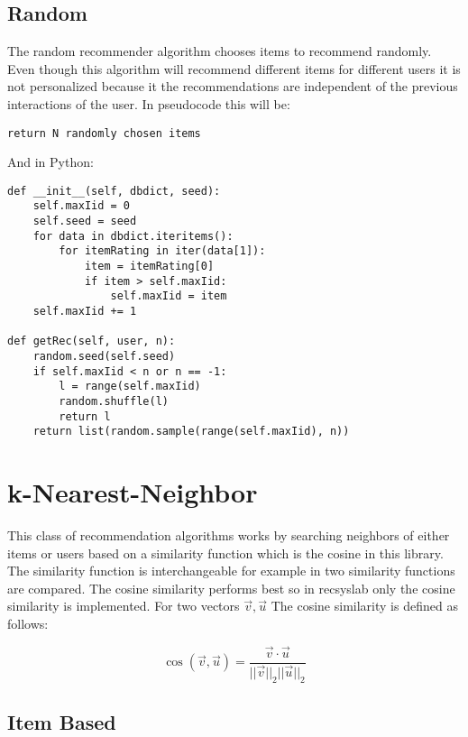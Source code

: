 \subsection{Random}

The random recommender algorithm chooses items to recommend randomly.
Even though this algorithm will recommend different items for different
users it is not personalized because it the recommendations are
independent of the previous interactions of the user.
In pseudocode this will be:
\begin{lstlisting}
return N randomly chosen items
\end{lstlisting}
And in Python:
\begin{lstlisting}
def __init__(self, dbdict, seed):
    self.maxIid = 0
    self.seed = seed
    for data in dbdict.iteritems():
        for itemRating in iter(data[1]):
            item = itemRating[0]
            if item > self.maxIid:
                self.maxIid = item
    self.maxIid += 1

def getRec(self, user, n):
    random.seed(self.seed)
    if self.maxIid < n or n == -1:
        l = range(self.maxIid)
        random.shuffle(l)
        return l
    return list(random.sample(range(self.maxIid), n))
\end{lstlisting}


\section{k-Nearest-Neighbor}

This class of recommendation algorithms works by searching neighbors
of either items or users based on a similarity function which is the
cosine in this library. The similarity function is interchangeable 
for example in
\cite{Karypis:2001:EIT:502585.502627} two similarity functions are
compared. The cosine similarity performs best so in recsyslab only the cosine similarity
is implemented. For two vectors \(\overrightarrow{v},\overrightarrow{u}\)
The cosine similarity is defined as follows:

\begin{equation}
\cos(\overrightarrow{v}, \overrightarrow{u})=\frac{\overrightarrow{v} \cdot \overrightarrow{u}}{||\overrightarrow{v}||_{2} ||\overrightarrow{u}||_{2}}
\end{equation}



\subsection{Item Based}
\label{itembasedknn}

